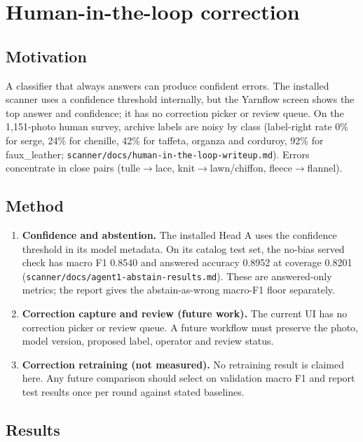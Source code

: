 \documentclass[11pt,a4paper]{article}
\begin{document}
\section{Human-in-the-loop correction}

\subsection{Motivation}

A classifier that always answers can produce confident errors. The installed scanner
uses a confidence threshold internally, but the Yarnflow screen shows the top answer
and confidence; it has no correction picker or review queue. On the 1{,}151-photo human
survey, archive labels are noisy by class (label-right rate 0\% for serge, 24\% for
chenille, 42\% for taffeta, organza and corduroy, 92\% for faux\_leather;
\texttt{scanner/docs/human-in-the-loop-writeup.md}). Errors concentrate in close pairs
(tulle$\to$lace, knit$\to$lawn/chiffon, fleece$\to$flannel).

\subsection{Method}

\begin{enumerate}[leftmargin=*]
  \item \textbf{Confidence and abstention.} The installed Head A uses the confidence
        threshold in its model metadata. On its catalog test set, the no-bias served
        check has macro F1 0.8540 and answered accuracy 0.8952 at coverage 0.8201
        (\texttt{scanner/docs/agent1-abstain-results.md}). These are answered-only
        metrics; the report gives the abstain-as-wrong macro-F1 floor separately.
  \item \textbf{Correction capture and review (future work).} The current UI has no
        correction picker or review queue. A future workflow must preserve the photo,
        model version, proposed label, operator and review status.
  \item \textbf{Correction retraining (not measured).} No retraining result is claimed
        here. Any future comparison should select on validation macro F1 and report
        test results once per round against stated baselines.
\end{enumerate}

\subsection{Results}
\end{document}
